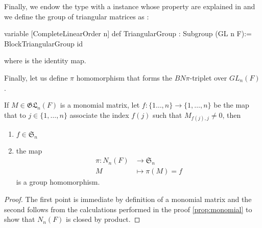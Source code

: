 Finally, we endow the type  with a \lean{[CompleteLinearOrder n]} instance whose property are explained in  and we define the group of triangular matrices as : 
\begin{leancode}
variable [CompleteLinearOrder n] 
def  TriangularGroup : Subgroup (GL n F):= BlockTriangularGroup id
\end{leancode}
where  is the identity map. 

Finally, let us define $\pi$ homomorphism that forms the $BN\pi$-triplet over $GL_n(F)$.

If $M \in  \mathfrak{GL}_n\left( F \right)$ is a monomial matrix, let $f : \{1\ldots,n\} \to  \{1,\ldots,n\}$ be the map that to $j \in \{ 1,\ldots,n\}$ associate the index $f(j)$ such that $M_{f(j), j} \neq 0$, then

\begin{lemme}
    \begin{enumerate}
        \item $f \in \mathfrak{S}_n$
        \item the map 
            \begin{align*}
                \pi : N_n\left( F \right) &\longrightarrow \mathfrak{S}_n \\
                M &\longmapsto \pi (M) = f  
            \end{align*} is a group homomorphism.
    \end{enumerate}
\end{lemme}

\begin{proof}
    The first point is immediate by definition of a monomial matrix and the second follows from the calculations performed in the proof \ref{prop:monomial} to show that $N_n\left( F \right)$ is closed by product.
\end{proof}




